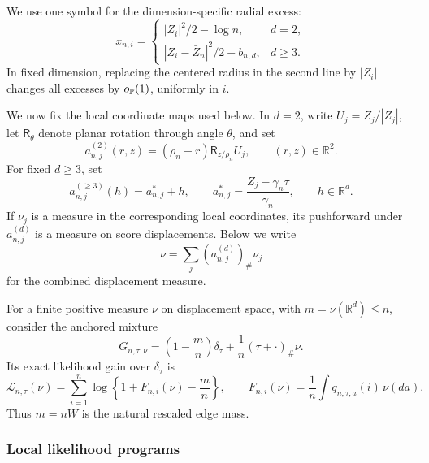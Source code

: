 We use one symbol for the dimension-specific radial excess:
\begin{equation}
\label{eq:fixed-support-radial-excess}
 x_{n,i}=
 \begin{cases}
   |Z_i|^2/2-\log n,&d=2,\\[2mm]
   |Z_i-\bar Z_n|^2/2-b_{n,d},&d\ge3.
 \end{cases}
\end{equation}
In fixed dimension, replacing the centered radius in the second line by
\(|Z_i|\) changes all excesses by \(o_{\mathbb P}(1)\), uniformly in \(i\).

We now fix the local coordinate maps used below. In \(d=2\), write
\(U_j=Z_j/|Z_j|\), let \(\mathsf R_\theta\) denote planar rotation through
angle \(\theta\), and set
\begin{equation}
\label{eq:support-d2-patch-map}
 a_{n,j}^{(2)}(r,z)
 = (\rho_n+r)\mathsf R_{z/\rho_n}U_j,
 \qquad (r,z)\in\mathbb R^2.
\end{equation}
For fixed \(d\ge3\), set
\begin{equation}
\label{eq:support-dge3-patch-map}
 a_{n,j}^{(\ge3)}(h)
 =a_{n,j}^*+h,
 \qquad
 a_{n,j}^*=\frac{Z_j-\gamma_n\tau}{\gamma_n},
 \qquad h\in\mathbb R^d.
\end{equation}
If \(\nu_j\) is a measure in the corresponding local coordinates, its
pushforward under \(a_{n,j}^{(d)}\) is a measure on score displacements. Below
we write
\begin{equation}
\label{eq:support-patch-pushforward}
    \nu=\sum_j(a_{n,j}^{(d)})_\#\nu_j
\end{equation}
for the combined displacement measure.

For a finite positive measure \(\nu\) on displacement space, with
\(m=\nu(\mathbb R^d)\le n\), consider the anchored mixture
\[
    G_{n,\tau,\nu}
    =\left(1-\frac mn\right)\delta_\tau
      +\frac1n(\tau+\cdot)_\#\nu .
\]
Its exact likelihood gain over \(\delta_\tau\) is
\begin{equation}
\label{eq:support-anchored-likelihood}
    \mathcal L_{n,\tau}(\nu)
    =\sum_{i=1}^n
      \log\left\{1+F_{n,i}(\nu)-\frac mn\right\},
    \qquad
    F_{n,i}(\nu)=\frac1n\int q_{n,\tau,a}(i)\,\nu(da).
\end{equation}
Thus \(m=nW\) is the natural rescaled edge mass.

\subsubsection{Local likelihood programs}

